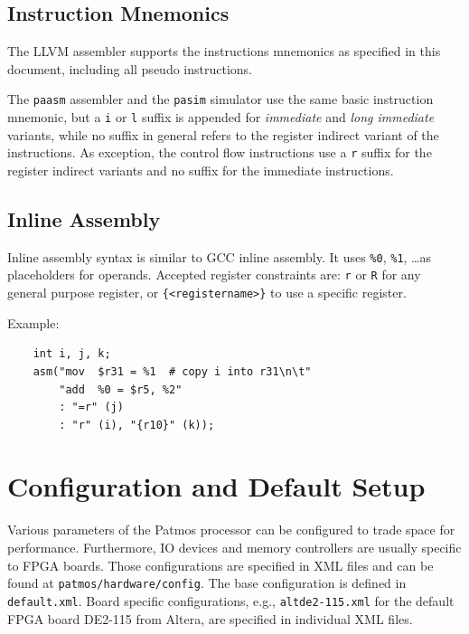 \documentclass[a4paper,fontsize=10pt,twoside,DIV15,BCOR12mm,headinclude=true,footinclude=false,pagesize,bibtotoc]{scrbook}
\newcommand{\code}[1]{{\texttt{#1}}}
\newcommand{\comment}[3]{

\textsf{\textbf{#1}} {\color{#3}#2}}
\newcommand{\stefan}[1]{\comment{Stefan}{#1}{RoyalPurple}}
\renewcommand{\stefan}[1]{}
\begin{document}
\subsection{Instruction Mnemonics}

The LLVM assembler supports the instructions mnemonics as specified in this document, including all pseudo instructions.

The \texttt{paasm} assembler and the \texttt{pasim} simulator use the same basic instruction mnemonic, but a \texttt{i} or
\texttt{l} suffix is appended for \emph{immediate} and \emph{long immediate} variants, while no suffix in general refers to
the register indirect variant of the instructions. As exception, the control flow instructions use a \texttt{r} suffix for the register
indirect variants and no suffix for the immediate instructions.
\stefan{This should be cleaned up, always use \texttt{i} suffix for immediates in pasim/paasm, including control flow.}

\subsection{Inline Assembly}

Inline assembly syntax is similar to GCC inline assembly. It uses \texttt{\%0}, \texttt{\%1}, \dots as placeholders
for operands. Accepted register constraints are: \texttt{r} or \texttt{R} for any general purpose register, or
\texttt{\{<registername>\}} to use a specific register.

Example:
\begin{lstlisting}
    int i, j, k;
    asm("mov  $r31 = %1  # copy i into r31\n\t"
        "add  %0 = $r5, %2"
        : "=r" (j)
        : "r" (i), "{r10}" (k));
\end{lstlisting}

\section{Configuration and Default Setup}

Various parameters of the Patmos processor can be configured to trade
space for performance. Furthermore, IO devices and memory controllers
are usually specific to FPGA boards. Those configurations are specified in
XML files and can be found at \code{patmos/hardware/config}. The base
configuration is defined in \code{default.xml}. Board specific configurations,
e.g., \code{altde2-115.xml} for the default FPGA board DE2-115 from Altera,
are specified in individual XML files.
\end{document}
